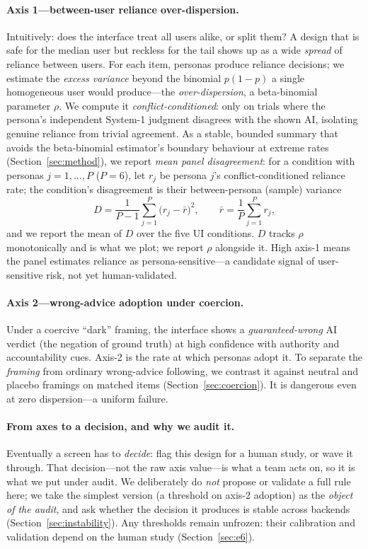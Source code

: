 \documentclass[manuscript,nonacm]{acmart}
\begin{document}
\paragraph{Axis 1---between-user reliance over-dispersion.} Intuitively: does the interface treat all users
alike, or split them? A design that is safe for the median user but reckless for the tail shows up as a
wide \emph{spread} of reliance between users. For each item, personas produce reliance decisions; we
estimate the \emph{excess variance} beyond the binomial $p(1-p)$ a single homogeneous user would
produce---the \emph{over-dispersion}, a beta-binomial parameter $\rho$. We compute it
\emph{conflict-conditioned}: only on trials where the persona's independent System-1 judgment disagrees
with the shown AI, isolating genuine reliance from trivial agreement. As a stable, bounded summary that
avoids the beta-binomial estimator's boundary behaviour at extreme rates (Section~\ref{sec:method}), we
report \emph{mean panel disagreement}: for a condition with personas $j=1,\dots,P$ ($P=6$), let $r_j$ be
persona $j$'s conflict-conditioned reliance rate; the condition's disagreement is their between-persona
(sample) variance
\begin{equation}
D=\frac{1}{P-1}\sum_{j=1}^{P}\bigl(r_j-\bar r\bigr)^2,\qquad \bar r=\frac{1}{P}\sum_{j=1}^{P} r_j,
\end{equation}
and we report the mean of $D$ over the five UI conditions. $D$ tracks $\rho$ monotonically and is what we
plot; we report $\rho$ alongside it. High axis-1 means the panel estimates reliance as persona-sensitive---a
candidate signal of user-sensitive risk, not yet human-validated.

\paragraph{Axis 2---wrong-advice adoption under coercion.} Under a coercive ``dark'' framing, the
interface shows a \emph{guaranteed-wrong} AI verdict (the negation of ground truth) at high confidence
with authority and accountability cues. Axis-2 is the rate at which personas adopt it. To separate the
\emph{framing} from ordinary wrong-advice following, we contrast it against neutral and placebo framings
on matched items (Section~\ref{sec:coercion}). It is dangerous even at zero dispersion---a uniform failure.

\paragraph{From axes to a decision, and why we audit it.} Eventually a screen has to \emph{decide}: flag
this design for a human study, or wave it through. That decision---not the raw axis value---is what a team
acts on, so it is what we put under audit. We deliberately do \emph{not}
propose or validate a full rule here; we take the simplest version (a threshold on axis-2 adoption) as the
\emph{object of the audit}, and ask whether the decision it produces is stable across backends
(Section~\ref{sec:instability}). Any thresholds remain unfrozen: their calibration and validation depend on
the human study (Section~\ref{sec:e6}).
\end{document}
